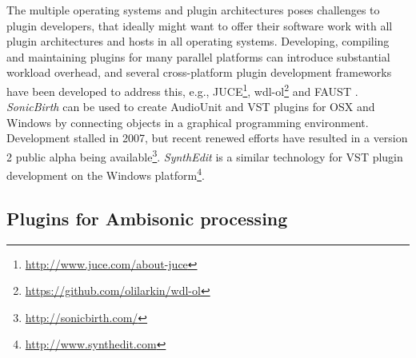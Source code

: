 \documentclass{article}
\begin{document}
The multiple operating systems and plugin architectures poses challenges to plugin developers, that ideally might want to offer their software work with all plugin architectures and hosts in all operating systems.
Developing, compiling and maintaining plugins for many parallel platforms can introduce substantial workload overhead, and several cross-platform plugin development frameworks have been developed to address this, e.g., JUCE\footnote{\href{http://www.juce.com/about-juce}{http://www.juce.com/about-juce}}, wdl-ol\footnote{\href{https://github.com/olilarkin/wdl-ol}{https://github.com/olilarkin/wdl-ol}} and FA\-UST \cite{smithFaust:2012}. 
\emph{SonicBirth} can be used to create AudioUnit and VST plugins for OSX and Windows by connecting objects in a graphical programming environment. Development stalled in 2007, but recent renewed efforts have resulted in a version 2 public alpha being available\footnote{\href{http://sonicbirth.com/}{http://sonicbirth.com/}}.
\emph{SynthEdit} is a similar technology for VST plugin development on the Windows platform\footnote{\href{http://www.synthedit.com}{http://www.synthedit.com}}.


\subsection{Plugins for Ambisonic processing}\label{sec:ambi-plugins}
\end{document}
